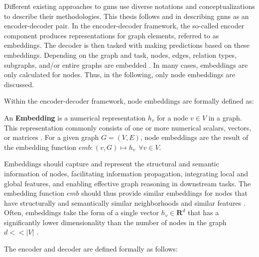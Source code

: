 Different existing approaches to \glspl{gnn} use diverse notations and conceptualizations to describe their methodologies. This thesis follows \cite{hamilton_representation_2017} and \cite{kazemi_representation_2019} in describing \glspl{gnn} as an encoder-decoder pair.
In the encoder-decoder framework, the so-called encoder component produces representations for graph elements, referred to as embeddings. The decoder is then tasked with making predictions based on these embeddings. Depending on the graph and task, nodes, edges, relation types, subgraphs, and/or entire graphs are embedded \cite{barros_survey_2023}. In many cases, embeddings are only calculated for nodes. Thus, in the following, only node embeddings are discussed.

Within the encoder-decoder framework, node embeddings are formally defined as: 

\begin{definition}
    \label{d_Embedding}
    An \textbf{Embedding} is a numerical representation $h_v$ for a node $v \in V$ in a graph. This representation commonly consists of one or more numerical scalars, vectors, or matrices \cite{kazemi_representation_2019}. For a given graph $G = (V, E)$, node embeddings are the result of the embedding function $emb: (v, G) \mapsto h_v \hspace{5pt} \forall v \in V$.
\end{definition}

Embeddings should capture and represent the structural and semantic information of nodes, facilitating information propagation, integrating local and global features, and enabling effective graph reasoning in downstream tasks\cite{goyal_graph_2018}. The embedding function $emb$ should thus provide similar embeddings for nodes that have structurally and semantically similar neighborhoods and similar features \cite{goyal_graph_2018, bronstein_geometric_2021}.
Often, embeddings take the form of a single vector $h_v \in \mathbf{R}^d$ that has a significantly lower dimensionality than the number of nodes in the graph $d<<|V|$ \cite{goyal_graph_2018}.

The encoder and decoder are defined formally as follows:

